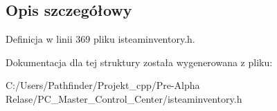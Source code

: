 \subsection{Opis szczegółowy}


Definicja w linii 369 pliku isteaminventory.\+h.



Dokumentacja dla tej struktury została wygenerowana z pliku\+:\begin{DoxyCompactItemize}
\item 
C\+:/\+Users/\+Pathfinder/\+Projekt\+\_\+cpp/\+Pre-\/\+Alpha Relase/\+P\+C\+\_\+\+Master\+\_\+\+Control\+\_\+\+Center/isteaminventory.\+h\end{DoxyCompactItemize}
